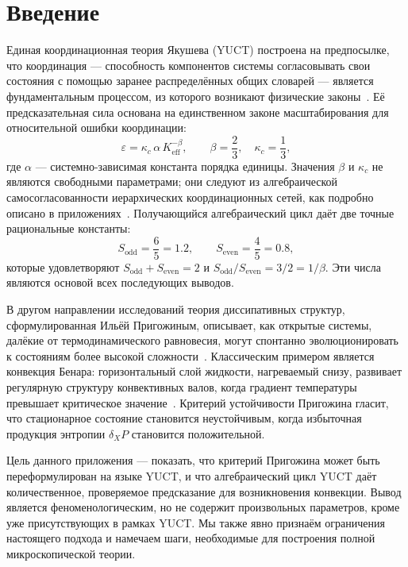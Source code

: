\documentclass[12pt,a4paper]{article}
\begin{document}
	\newpage
	\tableofcontents
	\newpage
	
	\section{Введение}
	
	Единая координационная теория Якушева (YUCT) построена на предпосылке, что координация — способность компонентов системы согласовывать свои состояния с помощью заранее распределённых общих словарей — является фундаментальным процессом, из которого возникают физические законы~\cite{Yakushev2026}. Её предсказательная сила основана на единственном законе масштабирования для относительной ошибки координации:
	\begin{equation}\label{eq:universal}
		\varepsilon = \kappa_c\,\alpha\, K_{\mathrm{eff}}^{-\beta},\qquad 
		\beta = \frac{2}{3},\quad \kappa_c = \frac{1}{3},
	\end{equation}
	где \(\alpha\) — системно-зависимая константа порядка единицы. Значения \(\beta\) и \(\kappa_c\) не являются свободными параметрами; они следуют из алгебраической самосогласованности иерархических координационных сетей, как подробно описано в приложениях~\cite{AppendixY, AppendixL, AppendixFerra, AppendixAF}. Получающийся алгебраический цикл даёт две точные рациональные константы:
	\begin{equation}\label{eq:S-constants}
		S_{\mathrm{odd}} = \frac{6}{5} = 1.2,\qquad
		S_{\mathrm{even}} = \frac{4}{5} = 0.8,
	\end{equation}
	которые удовлетворяют \(S_{\mathrm{odd}} + S_{\mathrm{even}} = 2\) и \(S_{\mathrm{odd}}/S_{\mathrm{even}} = 3/2 = 1/\beta\). Эти числа являются основой всех последующих выводов.
	
	В другом направлении исследований теория диссипативных структур, сформулированная Ильёй Пригожиным, описывает, как открытые системы, далёкие от термодинамического равновесия, могут спонтанно эволюционировать к состояниям более высокой сложности~\cite{Prigogine1977, Glansdorff1971}. Классическим примером является конвекция Бенара: горизонтальный слой жидкости, нагреваемый снизу, развивает регулярную структуру конвективных валов, когда градиент температуры превышает критическое значение~\cite{Chandrasekhar1961}. Критерий устойчивости Пригожина гласит, что стационарное состояние становится неустойчивым, когда избыточная продукция энтропии \(\delta_X P\) становится положительной.
	
	Цель данного приложения — показать, что критерий Пригожина может быть переформулирован на языке YUCT, и что алгебраический цикл YUCT даёт количественное, проверяемое предсказание для возникновения конвекции. Вывод является феноменологическим, но не содержит произвольных параметров, кроме уже присутствующих в рамках YUCT. Мы также явно признаём ограничения настоящего подхода и намечаем шаги, необходимые для построения полной микроскопической теории.
	
\end{document}
